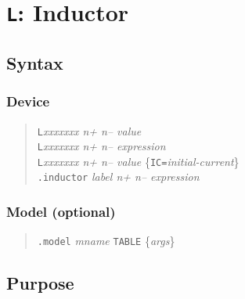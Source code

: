 %
%
%
%
\section{{\tt L}: Inductor}
\subsection{Syntax}
\subsubsection{Device}
\begin{verse}
{\tt L}{\it xxxxxxx n+ n-- value}\\
{\tt L}{\it xxxxxxx n+ n-- expression}\\
{\tt L}{\it xxxxxxx n+ n-- value}
	\{{\tt IC=}{\it initial-current}\}\\
{\tt .inductor} {\it label n+ n-- expression}
\end{verse}
\subsubsection{Model (optional)}
\begin{verse}
{\tt .model} {\it mname} {\tt TABLE} \{{\it args}\}
\end{verse}
\subsection{Purpose}

